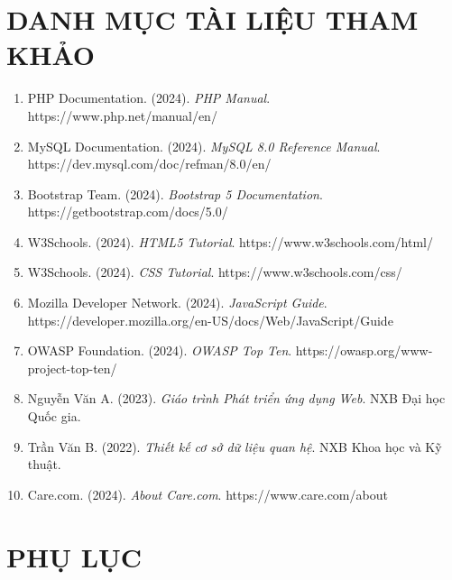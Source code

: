 \documentclass[12pt,a4paper]{report}
\begin{document}
\newpage

\chapter*{DANH MỤC TÀI LIỆU THAM KHẢO}

\begin{enumerate}
    \item PHP Documentation. (2024). \textit{PHP Manual}. https://www.php.net/manual/en/
    
    \item MySQL Documentation. (2024). \textit{MySQL 8.0 Reference Manual}. https://dev.mysql.com/doc/refman/8.0/en/
    
    \item Bootstrap Team. (2024). \textit{Bootstrap 5 Documentation}. https://getbootstrap.com/docs/5.0/
    
    \item W3Schools. (2024). \textit{HTML5 Tutorial}. https://www.w3schools.com/html/
    
    \item W3Schools. (2024). \textit{CSS Tutorial}. https://www.w3schools.com/css/
    
    \item Mozilla Developer Network. (2024). \textit{JavaScript Guide}. https://developer.mozilla.org/en-US/docs/Web/JavaScript/Guide
    
    \item OWASP Foundation. (2024). \textit{OWASP Top Ten}. https://owasp.org/www-project-top-ten/
    
    \item Nguyễn Văn A. (2023). \textit{Giáo trình Phát triển ứng dụng Web}. NXB Đại học Quốc gia.
    
    \item Trần Văn B. (2022). \textit{Thiết kế cơ sở dữ liệu quan hệ}. NXB Khoa học và Kỹ thuật.
    
    \item Care.com. (2024). \textit{About Care.com}. https://www.care.com/about
\end{enumerate}

\newpage

\chapter*{PHỤ LỤC}
\end{document}
